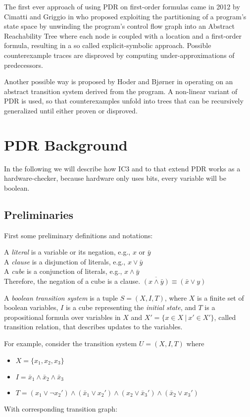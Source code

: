 \documentclass[11pt, a4paper, BCOR=10mm, ngerman, oneside]{scrbook}
\begin{document}
The first ever approach of using PDR on first-order formulas came in 2012 by Cimatti and Griggio in \cite{Zitat04} who proposed exploiting the partitioning of a program's state space by unwinding the program's control flow graph into an Abstract Reachability Tree where each node is coupled with a location and a first-order formula, resulting in a so called explicit-symbolic approach. Possible counterexample traces are disproved by computing under-approximations of predecessors. 

Another possible way is proposed by Hoder and Bjørner in \cite{GeneralizedIc3} operating on an abstract transition system derived from the program. A non-linear variant of PDR is used, so that counterexamples unfold into trees that can be recursively generalized until either proven or disproved.







\chapter{PDR Background}
\label{PDR}
In the following we will describe how IC3 and to that extend PDR works as a hardware-checker, because hardware only uses bits, every variable will be boolean.
\section{Preliminaries}
First some preliminary definitions and notations:  \par
A \textsl{literal} is a variable or its negation, e.g., $x \text{ or } \bar y$ \\
A \textsl{clause} is a disjunction of literals, e.g., $x \lor \bar y$ \\
A \textsl{cube} is a conjunction of literals, e.g.,  $x \land \bar y$ \\
Therefore, the negation of a cube is a clause. $\overline{(x \land \bar y)} \equiv (\bar x \lor y)$  \par
A \textsl{boolean transition system} is a tuple $S = (X, I, T)$, where $X$ is a finite set of boolean variables, $I$ is a cube representing the \textsl{initial state}, and $T$ is a propositional formula over variables in $X$ and $X' = \{x \in X \ | \ x' \in X'\}$, called transition relation, that describes updates to the variables.
\par
For example, consider the transition system $U = (X, I, T)$ where
\begin{itemize}
\item $ X= \{x_1, x_2, x_3\}$
\item $I = \bar x_1 \land \bar x_2 \land \bar x_3$
\item $T = (x_1 \lor \neg x_2' ) \land ( \bar x_1 \lor x_2') \land (x_2 \lor \bar x_3') \land ( \bar x_2 \lor x_3')$
\end{itemize}
\pagebreak
With corresponding transition graph:
\end{document}
